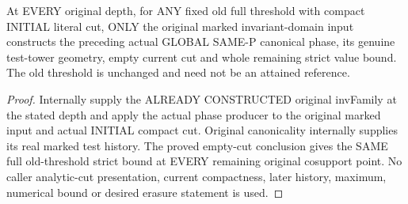 \begin{theorem}
\label{hir:original-all-depth-compact-upper-cut-global-phase}
\leanok
At EVERY original depth, for ANY fixed old full threshold with compact
INITIAL literal cut, ONLY the original marked invariant-domain input
constructs the preceding actual GLOBAL SAME-P canonical phase, its genuine
test-tower geometry, empty current cut and whole remaining strict value bound.
The old threshold is unchanged and need not be an attained reference.
\end{theorem}
\begin{proof}
Internally supply the ALREADY CONSTRUCTED original invFamily at the stated
depth and apply the actual phase producer to the original marked input and
actual INITIAL compact cut. Original canonicality internally supplies its
real marked test history. The proved empty-cut conclusion gives the SAME
full old-threshold strict bound at EVERY remaining original cosupport point.
No caller analytic-cut presentation, current compactness, later history,
maximum, numerical bound or desired erasure statement is used.
\end{proof}
